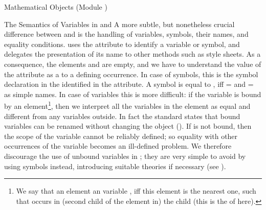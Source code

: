 \begin{tchapter}[id=mobj,short=Mathematical Objects]{Mathematical Objects (Module {})}
\begin{tsection}[id=sem-var,short=Semantics of Variables]{The Semantics of Variables in
    {\openmath} and {\cmathml}}
  A more subtle, but nonetheless crucial difference between {\openmath} and {\mathml} is
  the handling of variables, symbols, their names, and equality conditions.  {\openmath}
  uses the {} attribute to identify a variable or
  symbol, and delegates the presentation of its name to other methods such as style
  sheets. As a consequence, the elements {} and
  {} are empty, and we have to understand the value of the
  {} attribute as a {} to a
  defining occurrence. In case of symbols, this is the symbol declaration in the
  {} identified in the {}
  attribute. A symbol {}
  is equal to {}, iff
  {=} and {=} as
  {\xml} simple names.  In case of variables this is more difficult: if the variable is
  bound by an {} element\footnote{We say
    that an {} element {} an
    {\openmath} variable {}, iff this
    {} element is the nearest one, such that {} occurs in (second child of the {} element
    in) the {} child (this is the
    {} of {} here).}, then we
  interpret all the variables {} in the
  {} element as equal and different from any variables
  {} outside. In fact the {\openmath} standard states that bound
  variables can be renamed without changing the object
  ({}). If {} is not bound, then the scope of the variable cannot be reliably
  defined; so equality with other occurrences of the variable {}
  becomes an ill-defined problem.  We therefore discourage the use of unbound variables in
  {\omdoc}; they are very simple to avoid by using symbols instead, introducing suitable
  theories if necessary (see {}).


\end{tsection}
\end{tchapter}
